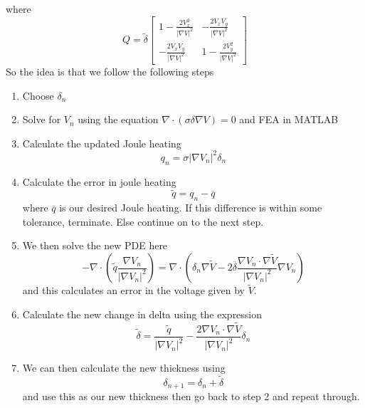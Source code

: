 \documentclass[12pt]{article}
\begin{document}
where 
\[
Q = \widetilde{\delta}
\begin{bmatrix}
\displaystyle 1-\frac{2V_x^2}{|\nabla V|^2} & \displaystyle -\frac{2V_xV_y}{|\nabla V|^2} \\[1em]
\displaystyle -\frac{2V_xV_y}{|\nabla V|^2} & \displaystyle 1-\frac{2V_y^2}{|\nabla V|^2}
\end{bmatrix}
\]
So the idea is that we follow the following steps
\begin{enumerate}
\item 
Choose $\delta_n$
\item
Solve for $V_n$ using the equation $\nabla \cdot (\sigma \delta \nabla V) = 0$ and FEA in MATLAB
\item
Calculate the updated Joule heating
\[
q_n = \sigma |\nabla V_n|^2 \delta_n
\]
\item
Calculate the error in joule heating
\[
\widetilde{q} = q_n - \overline{q}
\]
where $\overline{q}$ is our desired Joule heating.
If this difference is within some tolerance, terminate.
Else continue on to the next step.
\item
We then solve the new PDE here
\[
-\nabla \cdot \left( \widetilde{q} \frac{\nabla V_n}{|\nabla V_n|^2}\right) 
=
\nabla \cdot \left(\delta_n \nabla \widetilde{V} -2 \overline{\delta} \frac{\nabla {V_n}\cdot \nabla \widetilde{V}}{|\nabla {V_n}|^2}\nabla {V_n} \right) 
\]
and this calculates an error in the voltage given by $\widetilde{V}$.
\item
Calculate the new change in delta using the expression
\[
\widetilde{\delta} = \frac{\widetilde{q}}{|\nabla {V_n}|^2}-\frac{2\nabla {V_n}\cdot \nabla \widetilde{V}}{|\nabla {V_n}|^2}\delta_n
\]
\item
We can then calculate the new thickness using 
\[
\delta_{n+1} = \delta_n + \widetilde{\delta}
\]
and use this as our new thickness then go back to step 2 and repeat through.
\end{enumerate}
\end{document}
